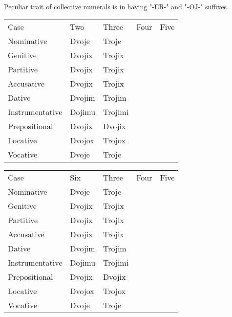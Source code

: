 Peculiar trait of collective numerals is in having "-ER-" and "-OJ-" suffixes.

\begin{table}
	\begin{tabular}{lllll}
		Case & Two & Three & Four & Five \\
		Nominative & Dvoje & Troje & & \\
		Genitive & Dvojix & Trojix && \\
		Partitive & Dvojix & Trojix && \\
		Accusative & Dvojix & Trojix && \\
		Dative & Dvojim & Trojim && \\
		Instrumentative & Dojimu & Trojimi && \\
		Prepositional & Dvojix & Dvojix && \\
		Locative & Dvojox & Trojox & & \\
		Vocative & Dvoje & Troje && \\
	\end{tabular}
\end{table}

\begin{table}
	\begin{tabular}{lllll}
		Case & Six & Three & Four & Five \\
		Nominative & Dvoje & Troje & & \\
		Genitive & Dvojix & Trojix && \\
		Partitive & Dvojix & Trojix && \\
		Accusative & Dvojix & Trojix && \\
		Dative & Dvojim & Trojim && \\
		Instrumentative & Dojimu & Trojimi && \\
		Prepositional & Dvojix & Dvojix && \\
		Locative & Dvojox & Trojox & & \\
		Vocative & Dvoje & Troje && \\
	\end{tabular}
\end{table}


